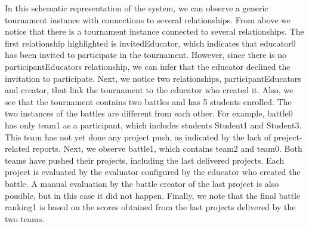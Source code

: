In this schematic representation of the system, we can observe a generic tournament instance with connections to several relationships. From above we notice that there is a tournament instance connected to several relationships. The first relationship highlighted is invitedEducator, which indicates that educator0 has been invited to participate in the tournament. However, since there is no participantEducators relationship, we can infer that the educator declined the invitation to participate.
\vspace{1\baselineskip}
\newline
Next, we notice two relationships, participantEducators and creator, that link the tournament to the educator who created it. Also, we see that the tournament contains two battles and has 5 students enrolled. The two instances of the battles are different from each other. For example, battle0 has only team1 as a participant, which includes students Student1 and Student3. This team has not yet done any project push, as indicated by the lack of project-related reports.
\vspace{1\baselineskip}
\newline
Next, we observe battle1, which contains team2 and team0. Both teams have pushed their projects, including the last delivered projects. Each project is evaluated by the evaluator configured by the educator who created the battle. A manual evaluation by the battle creator of the last project is also possible, but in this case it did not happen. Finally, we note that the final battle ranking1 is based on the scores obtained from the last projects delivered by the two teams.




